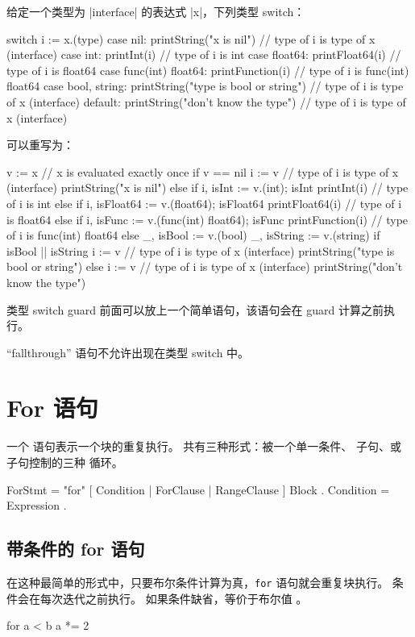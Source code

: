 给定一个类型为 \code|interface{}| 的表达式 \code|x|，下列类型 switch：
\begin{goblock}
switch i := x.(type) {
case nil:
	printString("x is nil")                // type of i is type of x (interface{})
case int:
	printInt(i)                            // type of i is int
case float64:
	printFloat64(i)                        // type of i is float64
case func(int) float64:
	printFunction(i)                       // type of i is func(int) float64
case bool, string:
	printString("type is bool or string")  // type of i is type of x (interface{})
default:
	printString("don't know the type")     // type of i is type of x (interface{})
}
\end{goblock}
可以重写为：
\begin{goblock}
v := x  // x is evaluated exactly once
if v == nil {
	i := v                                 // type of i is type of x (interface{})
	printString("x is nil")
} else if i, isInt := v.(int); isInt {
	printInt(i)                            // type of i is int
} else if i, isFloat64 := v.(float64); isFloat64 {
	printFloat64(i)                        // type of i is float64
} else if i, isFunc := v.(func(int) float64); isFunc {
	printFunction(i)                       // type of i is func(int) float64
} else {
	_, isBool := v.(bool)
	_, isString := v.(string)
	if isBool || isString {
		i := v                         // type of i is type of x (interface{})
		printString("type is bool or string")
	} else {
		i := v                         // type of i is type of x (interface{})
		printString("don't know the type")
	}
}
\end{goblock}

类型 switch guard 前面可以放上一个简单语句，该语句会在 guard 计算之前执行。

``fallthrough'' 语句不允许出现在类型 switch 中。

\section{For 语句}\label{sec:for}
一个  语句表示一个块的重复执行。
共有三种形式：被一个单一条件、 子句、或  子句控制的三种  循环。
\begin{EBNF}
ForStmt = "for" [ Condition | ForClause | RangeClause ] Block .
Condition = Expression .
\end{EBNF}

\subsection{带条件的 for 语句}
在这种最简单的形式中，只要布尔条件计算为真，\verb|for| 语句就会重复块执行。
条件会在每次迭代之前执行。
如果条件缺省，等价于布尔值 。
\begin{golang}
for a < b {
	a *= 2
}
\end{golang}

